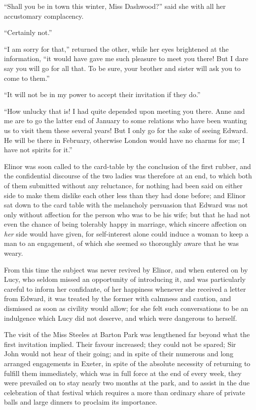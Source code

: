 \documentclass{article}
\begin{document}
``Shall you be in town this winter, Miss Dashwood?''
said she with all her accustomary complacency.

``Certainly not.''

``I am sorry for that,'' returned the other,
while her eyes brightened at the information,
``it would have gave me such pleasure to meet you there!
But I dare say you will go for all that.  To be sure,
your brother and sister will ask you to come to them.''

``It will not be in my power to accept their invitation
if they do.''

``How unlucky that is! I had quite depended upon
meeting you there.  Anne and me are to go the latter end
of January to some relations who have been wanting us to
visit them these several years!  But I only go for the sake
of seeing Edward.  He will be there in February, otherwise
London would have no charms for me; I have not spirits for it.''

Elinor was soon called to the card-table by the
conclusion of the first rubber, and the confidential
discourse of the two ladies was therefore at an end,
to which both of them submitted without any reluctance,
for nothing had been said on either side to make them
dislike each other less than they had done before;
and Elinor sat down to the card table with the melancholy
persuasion that Edward was not only without affection
for the person who was to be his wife; but that he had
not even the chance of being tolerably happy in marriage,
which sincere affection on \emph{her} side would have given,
for self-interest alone could induce a woman to keep a man
to an engagement, of which she seemed so thoroughly aware
that he was weary.

From this time the subject was never revived by Elinor,
and when entered on by Lucy, who seldom missed an opportunity
of introducing it, and was particularly careful to inform
her confidante, of her happiness whenever she received a letter
from Edward, it was treated by the former with calmness
and caution, and dismissed as soon as civility would allow;
for she felt such conversations to be an indulgence which
Lucy did not deserve, and which were dangerous to herself.

The visit of the Miss Steeles at Barton Park was
lengthened far beyond what the first invitation implied.
Their favour increased; they could not be spared;
Sir John would not hear of their going; and in spite
of their numerous and long arranged engagements in Exeter,
in spite of the absolute necessity of returning to fulfill
them immediately, which was in full force at the end
of every week, they were prevailed on to stay nearly two
months at the park, and to assist in the due celebration
of that festival which requires a more than ordinary
share of private balls and large dinners to proclaim
its importance.
\end{document}
